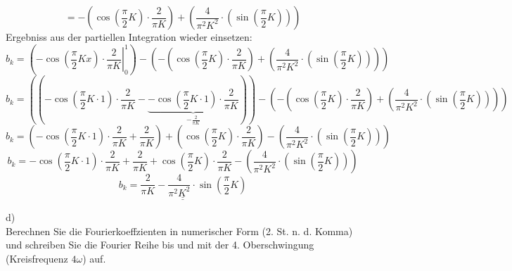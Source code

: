 \[ = -\left(\cos\left(\frac{\pi}{2}K\right) \cdot \frac{2}{\pi K}\right) + 
\left(\frac{4}{\pi^2 K^2} \cdot \left(\sin\left(\frac{\pi}{2}K\right)\right)\right) \]
Ergebniss aus der partiellen Integration wieder einsetzen: 
\[ b_k = \left(\left.-\cos\left(\frac{\pi}{2}K x\right) \cdot \frac{2}{\pi K}\right|_0^1 \right) - \left(-\left(\cos\left(\frac{\pi}{2}K\right) \cdot \frac{2}{\pi K}\right) + \left(\frac{4}{\pi^2 K^2} \cdot \left(\sin\left(\frac{\pi}{2}K\right)\right)\right)\right) \]
\[ b_k = \left(\left(-\cos\left(\frac{\pi}{2}K \cdot 1\right) \cdot \frac{2}{\pi K} - \underbrace{-\cos\left(\frac{\pi}{2}K \cdot 1\right) \cdot \frac{2}{\pi K}}_{-\frac{2}{\pi K}}\right) \right)- \left(-\left(\cos\left(\frac{\pi}{2}K\right) \cdot \frac{2}{\pi K}\right) + \left(\frac{4}{\pi^2 K^2} \cdot \left(\sin\left(\frac{\pi}{2}K\right)\right)\right)\right) \]
\[ b_k = \left(-\cos\left(\frac{\pi}{2}K \cdot 1\right) \cdot \frac{2}{\pi K} + \frac{2}{\pi K}\right) + \left(\cos\left(\frac{\pi}{2}K\right) \cdot \frac{2}{\pi K}\right) - \left(\frac{4}{\pi^2 K^2} \cdot \left(\sin\left(\frac{\pi}{2}K\right)\right)\right) \]
\[ b_k = -\cos\left(\frac{\pi}{2}K \cdot 1\right) \cdot \frac{2}{\pi K} + \frac{2}{\pi K} + \cos\left(\frac{\pi}{2}K\right) \cdot \frac{2}{\pi K} - \left(\frac{4}{\pi^2 K^2} \cdot \left(\sin\left(\frac{\pi}{2}K\right)\right)\right) \]
\[ \underline{\underline{b_k = \frac{2}{\pi K} - \frac{4}{\pi^2 K^2} \cdot \sin\left(\frac{\pi}{2}K\right)}} \]
\[  \]
\[  \]
\[  \]
\[  \]
\[  \]
\[  \]
\[  \]

d)\\
Berechnen Sie die Fourierkoeffzienten in numerischer Form (2. St. n. d.
Komma) und schreiben Sie die Fourier Reihe bis und mit der 4. Oberschwingung (Kreisfrequenz $4\omega$) auf.